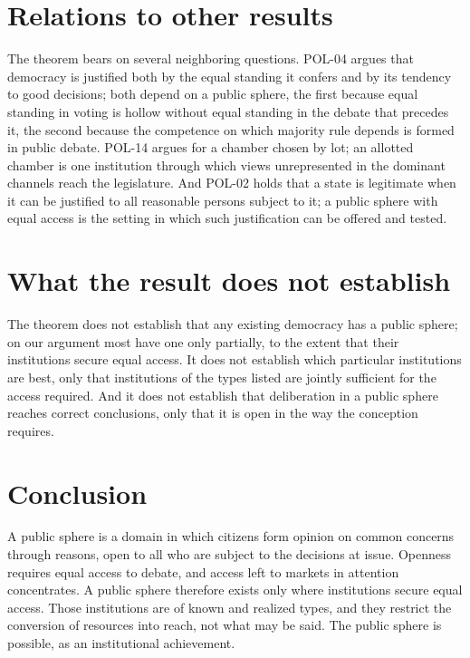 \documentclass{situationist-preprint}
\begin{document}
\section{Relations to other results}

The theorem bears on several neighboring questions. POL-04 argues that democracy is justified both by the equal standing it confers and by its tendency to good decisions; both depend on a public sphere, the first because equal standing in voting is hollow without equal standing in the debate that precedes it, the second because the competence on which majority rule depends is formed in public debate. POL-14 argues for a chamber chosen by lot; an allotted chamber is one institution through which views unrepresented in the dominant channels reach the legislature. And POL-02 holds that a state is legitimate when it can be justified to all reasonable persons subject to it; a public sphere with equal access is the setting in which such justification can be offered and tested.

\section{What the result does not establish}

The theorem does not establish that any existing democracy has a public sphere; on our argument most have one only partially, to the extent that their institutions secure equal access. It does not establish which particular institutions are best, only that institutions of the types listed are jointly sufficient for the access required. And it does not establish that deliberation in a public sphere reaches correct conclusions, only that it is open in the way the conception requires.

\section{Conclusion}

A public sphere is a domain in which citizens form opinion on common concerns through reasons, open to all who are subject to the decisions at issue. Openness requires equal access to debate, and access left to markets in attention concentrates. A public sphere therefore exists only where institutions secure equal access. Those institutions are of known and realized types, and they restrict the conversion of resources into reach, not what may be said. The public sphere is possible, as an institutional achievement.
\end{document}
